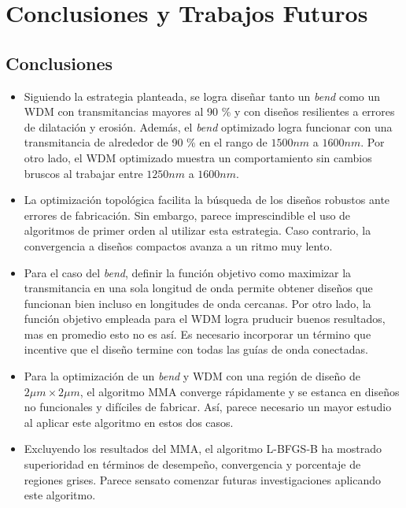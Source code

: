 \chapter{Conclusiones y Trabajos Futuros}\label{chapter:conclutions}

\section{Conclusiones}

\begin{itemize}

  \item Siguiendo la estrategia planteada, se logra diseñar tanto un \emph{bend} 
        como un WDM con transmitancias mayores al 90 \% y
        con diseños resilientes a errores de dilatación y erosión.
        Además, el \emph{bend} optimizado logra funcionar con una transmitancia de alrededor de 90 \%
        en el rango de $1500nm$ a $1600 nm$. 
        Por otro lado, el WDM optimizado muestra un comportamiento
        sin cambios bruscos al trabajar entre $1250 nm$ a $1600 nm$.

  \item La optimización topológica facilita la búsqueda de los diseños robustos
        ante errores de fabricación.
        Sin embargo, parece imprescindible el uso de algoritmos de primer orden al utilizar
        esta estrategia. 
        Caso contrario, la convergencia a diseños compactos avanza a un ritmo muy lento.

  \item Para el caso del \emph{bend}, definir la función objetivo 
        como maximizar la transmitancia en una sola longitud de onda
        permite obtener diseños que funcionan bien incluso en longitudes de
        onda cercanas. 
        Por otro lado, la función objetivo empleada para el WDM 
        logra pruducir buenos resultados, mas en promedio esto no es así.
        Es necesario incorporar un término que incentive que el diseño
        termine con todas las guías de onda conectadas.

  \item Para la optimización de un \emph{bend} y WDM con una región de diseño de $2 \mu m \times 2 \mu m$,
        el algoritmo MMA converge rápidamente y se estanca en diseños no funcionales y
        difíciles de fabricar. Así, parece necesario un mayor estudio al aplicar
        este algoritmo en estos dos casos.

  \item Excluyendo los resultados del MMA, el algoritmo L-BFGS-B ha mostrado superioridad
        en términos de desempeño, convergencia y porcentaje de regiones grises. 
        Parece sensato comenzar futuras investigaciones aplicando este algoritmo.


\end{itemize}
